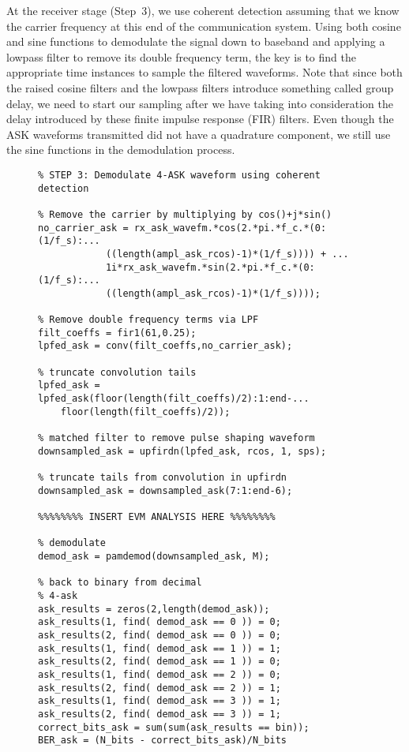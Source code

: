 \documentclass[letterpaper,12pt]{article}
\begin{document}
At the receiver stage (Step~3), we use coherent detection assuming that we know the carrier frequency at this end of the communication system. Using both cosine and sine functions to demodulate the signal down to baseband
and applying a lowpass filter to remove its double frequency term, the key is to find the appropriate time instances to sample the filtered waveforms.  Note that since both the raised cosine filters and the 
lowpass filters introduce something called group delay, we need to start our sampling after we have taking into consideration the delay introduced by these finite impulse response (FIR) filters.  Even though the ASK 
waveforms transmitted did not have a quadrature component, we still use the sine functions in the demodulation process. 
\begin{figure}[h]
\centering
\begin{minipage}[framed]{0.9\textwidth}
\begin{lstlisting}
% STEP 3: Demodulate 4-ASK waveform using coherent detection

% Remove the carrier by multiplying by cos()+j*sin()
no_carrier_ask = rx_ask_wavefm.*cos(2.*pi.*f_c.*(0:(1/f_s):...
            ((length(ampl_ask_rcos)-1)*(1/f_s)))) + ...
            1i*rx_ask_wavefm.*sin(2.*pi.*f_c.*(0:(1/f_s):...
            ((length(ampl_ask_rcos)-1)*(1/f_s))));

% Remove double frequency terms via LPF
filt_coeffs = fir1(61,0.25);
lpfed_ask = conv(filt_coeffs,no_carrier_ask);

% truncate convolution tails
lpfed_ask = lpfed_ask(floor(length(filt_coeffs)/2):1:end-...
    floor(length(filt_coeffs)/2));

% matched filter to remove pulse shaping waveform
downsampled_ask = upfirdn(lpfed_ask, rcos, 1, sps);

% truncate tails from convolution in upfirdn
downsampled_ask = downsampled_ask(7:1:end-6);

%%%%%%%% INSERT EVM ANALYSIS HERE %%%%%%%%

% demodulate
demod_ask = pamdemod(downsampled_ask, M);

% back to binary from decimal
% 4-ask
ask_results = zeros(2,length(demod_ask));
ask_results(1, find( demod_ask == 0 )) = 0;
ask_results(2, find( demod_ask == 0 )) = 0;
ask_results(1, find( demod_ask == 1 )) = 1;
ask_results(2, find( demod_ask == 1 )) = 0;
ask_results(1, find( demod_ask == 2 )) = 0;
ask_results(2, find( demod_ask == 2 )) = 1;
ask_results(1, find( demod_ask == 3 )) = 1;
ask_results(2, find( demod_ask == 3 )) = 1;
correct_bits_ask = sum(sum(ask_results == bin));
BER_ask = (N_bits - correct_bits_ask)/N_bits
\end{lstlisting}
\end{minipage}
\captionsetup{labelformat=empty}
\end{figure}
\end{document}
